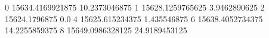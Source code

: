 0 15634.4169921875 10.2373046875
1 15628.1259765625 3.9462890625
2 15624.1796875 0.0
4 15625.615234375 1.435546875
6 15638.4052734375 14.2255859375
8 15649.0986328125 24.9189453125
